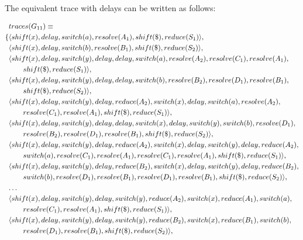 \documentclass[a4paper,11pt]{article}
\begin{document}
The equivalent trace with delays can be written as follows:

{\small\parbox{\textwidth}{\begin{align*}
&traces(G_{11}) \equiv \\
\{ & \langle shift(x), delay, switch(a), resolve(A_1), shift(\$), reduce(S_1) \rangle,\\
   & \langle shift(x), delay, switch(b), resolve(B_1), shift(\$), reduce(S_2) \rangle,\\
   & \langle shift(x), delay, switch(y), delay, delay, switch(a), resolve(A_2), resolve(C_1), resolve(A_1), \\ & \qquad shift(\$), reduce(S_1) \rangle,\\
   & \langle shift(x), delay, switch(y), delay, delay, switch(b), resolve(B_2), resolve(D_1), resolve(B_1), \\ & \qquad shift(\$), reduce(S_2) \rangle,\\
   & \langle shift(x), delay, switch(y), delay, reduce(A_2), switch(x), delay, switch(a), resolve(A_2), \\ & \qquad resolve(C_1), resolve(A_1), shift(\$), reduce(S_1) \rangle,\\
   & \langle shift(x), delay, switch(y), delay, delay, switch(x), delay, switch(y), switch(b), resolve(D_1), \\ & \qquad resolve(B_2), resolve(D_1), resolve(B_1), shift(\$), reduce(S_2) \rangle,\\
   & \langle shift(x), delay, switch(y), delay, reduce(A_2), switch(x), delay, switch(y), delay, reduce(A_2), \\ & \qquad switch(a), resolve(C_1), resolve(A_1), resolve(C_1), resolve(A_1), shift(\$), reduce(S_1) \rangle,\\
   & \langle shift(x), delay, switch(y), delay, reduce(B_2), switch(x), delay, switch(y), delay, reduce(B_2), \\ & \qquad switch(b), resolve(D_1), resolve(B_1), resolve(D_1), resolve(B_1), shift(\$), reduce(S_2) \rangle,\\
   & \textellipsis \\
   & \langle shift(x), delay, switch(y), delay, switch(y), reduce(A_2), switch(x), reduce(A_1), switch(a), \\ & \qquad resolve(C_1), resolve(A_1), shift(\$), reduce(S_1) \rangle,\\
   & \langle shift(x), delay, switch(y), delay, switch(y), reduce(B_2), switch(x), reduce(B_1), switch(b), \\ & \qquad resolve(D_1), resolve(B_1), shift(\$), reduce(S_2) \rangle,\\

\end{align*}}}
\end{document}
